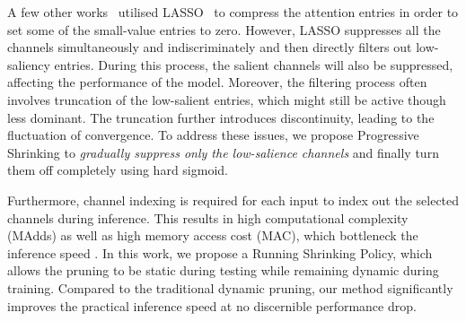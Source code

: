 \documentclass[lettersize,journal]{IEEEtran}
\begin{document}
A few other works~\cite{gao2018dynamic,su2020dynamic,tang2021manifold} utilised LASSO~\cite{tibshirani1996regression} to compress the attention entries in order to set some of the small-value entries to zero. However, LASSO suppresses all the channels simultaneously and indiscriminately and then directly filters out low-saliency entries. During this process, the salient channels will also be suppressed, affecting the performance of the model. Moreover, the filtering process often involves truncation of the low-salient entries, which might still be active though less dominant. The truncation further introduces discontinuity, leading to the fluctuation of convergence. To address these issues, we propose Progressive Shrinking to \emph{gradually suppress only the low-salience channels} and finally turn them off completely using hard sigmoid.





Furthermore, channel indexing is required for each input to index out the selected channels during inference. This results in high computational complexity (MAdds) as well as high memory access cost (MAC), which bottleneck the inference speed \cite{ma2018shufflenet}. In this work, we propose a Running Shrinking Policy, which allows the pruning to be static during testing while remaining dynamic during training. Compared to the traditional dynamic pruning, our method significantly improves the practical inference speed at no discernible performance drop. 





\begin{comment}
\begin{align}
  z
  = \left\{
            \begin{array}{cl}
                z ,  & z\geq\eta \\
                0 , & z<\eta
            \end{array}
            \right. ,
\end{align}
\end{comment}
\end{document}
